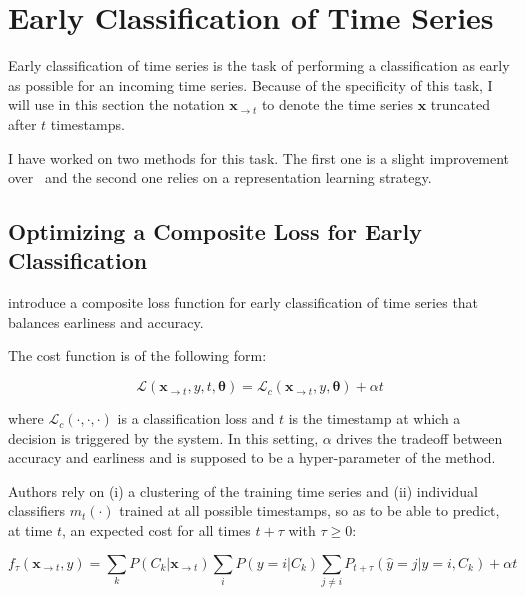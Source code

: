 \section{Early Classification of Time Series}
\label{sec:early}

Early classification of time series is the task of performing a classification
as early as possible for an incoming time series.
Because of the specificity of this task, I will use in this section the
notation $\mathbf{x}_{\rightarrow t}$ to denote the time series $\mathbf{x}$
truncated after $t$ timestamps.

I have worked on two methods for this task.
The first one is a slight improvement
over~\cite{dachraoui2015early} and the second one relies on a representation
learning strategy.

\subsection{Optimizing a Composite Loss for Early Classification}

\cite{dachraoui2015early} introduce a composite loss function for early
classification of time series that balances earliness and accuracy.

The cost function is of the following form:

\begin{equation}
\mathcal{L}(\mathbf{x}_{\rightarrow t}, y, t, \boldsymbol{\theta}) =
    \mathcal{L}_c(\mathbf{x}_{\rightarrow t}, y, \boldsymbol{\theta}) + \alpha t
\label{eq:loss_early}
\end{equation}

where $\mathcal{L}_c(\cdot,\cdot,\cdot)$ is a
classification loss and $t$ is the timestamp at which a
decision is triggered by the system.
In this setting, $\alpha$ drives the tradeoff between accuracy and earliness
and is supposed to be a hyper-parameter of the method.

Authors rely on (i) a clustering of the
training
time series and (ii) individual classifiers $m_t(\cdot)$ trained at all possible
timestamps, so as to be able to predict, at time $t$, an expected cost for all
times $t + \tau$ with $\tau \geq 0$:

\begin{equation}
    f_\tau(\mathbf{x}_{\rightarrow t}, y) =
        \sum_k P(C_k | \mathbf{x}_{\rightarrow t})
        \sum_i P(y=i | C_k)
        \sum_{j \neq i} P_{t+\tau}(\hat{y} = j | y=i, C_k)
        + \alpha t
        \label{eq:dachraoui}
\end{equation}

